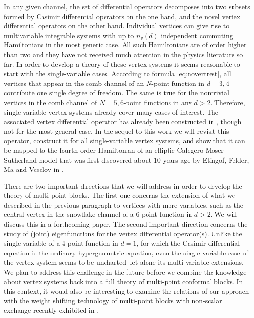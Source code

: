 \documentclass{article}
\begin{document}
In any given channel, the set of differential operators decomposes into two subsets formed by 
Casimir differential operators on the one hand, and the novel vertex 
differential operators on the other hand. Individual vertices can give rise to multivariable integrable systems with up to $n_v(d)$ independent commuting Hamiltonians in the most generic case. All such Hamiltonians are of order 
higher than two and they have not received much attention in the physics literature so far. 
In order to develop a theory of these vertex systems it seems reasonable to start with the single-variable cases. According to formula \eqref{eq:novertrest}, all vertices that 
appear in the comb channel of an $N$-point function in $d=3,4$ contribute one single degree of freedom. The same is true for the nontrivial vertices in the comb channel of $N=5,6$-point 
functions in any $d > 2$. Therefore, single-variable vertex systems already cover many 
cases of interest. The associated vertex differential operator has already been 
constructed in \cite{Buric:2020dyz}, though not for the most general case. In the 
sequel to this work we will revisit this operator, construct it for all 
single-variable vertex systems, and show that it can be mapped to the fourth order 
Hamiltonian of an elliptic Calogero-Moser-Sutherland model that was first 
discovered about 10 years ago by Etingof, Felder, Ma and Veselov in 
\cite{etingof2021elliptic}. 


There are two important directions that we will address in order to develop the theory of 
multi-point blocks. The first one concerns the extension of what we described in the previous 
paragraph to vertices with more variables, such as the central vertex in the snowflake 
channel of a $6$-point function in $d > 2$. We will discuss this in a forthcoming paper. 
The second important direction concerns the study of (joint) eigenfunctions for the vertex 
differential operator(s). Unlike the single variable of a 4-point function in $d=1$, for which 
the Casimir 
differential equation is the ordinary hypergeometric equation, even the single variable 
case of the vertex system seems to be uncharted, let alone its multi-variable extensions. 
We plan to address this challenge in the future before we combine the knowledge about 
vertex systems back into a full theory of multi-point conformal blocks. In this context, 
it would also be interesting to examine the relations of our approach with the weight shifting 
technology of multi-point blocks with non-scalar exchange recently exhibited in \cite{Poland:2021xjs}. 
\end{document}
